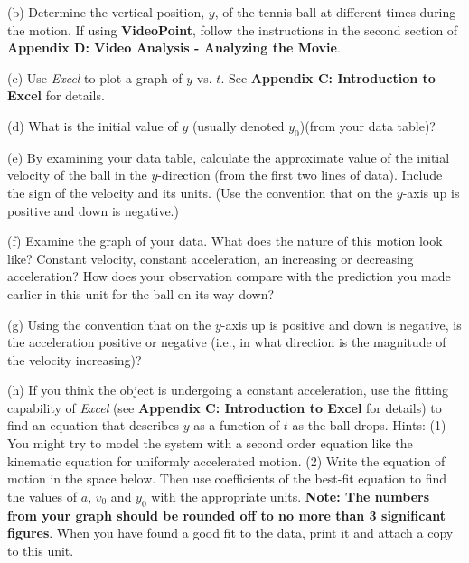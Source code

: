 (b) Determine the vertical position, $y$, of the tennis ball at different times
during the motion. If using \textbf{VideoPoint}, follow the instructions in the second section of \textbf{Appendix D: Video Analysis - Analyzing the Movie}. 

(c) Use \textit{Excel} to plot a graph of $y$ vs. $t$. See \textbf{Appendix
C: Introduction to Excel} for details.

(d) What is the initial value of $y$ (usually denoted \( y_{0} \))(from your data table)? 
\vspace{10mm}

(e) By examining your data table, calculate the approximate value of the initial velocity of the ball in the $y$-direction (from the first two lines of data). Include the sign of the velocity and its units. (Use the convention that on the $y$-axis up is positive and down is negative.)
\vspace{20mm}

(f) Examine the graph of your data. What does the nature of this motion look
like? Constant velocity, constant acceleration, an increasing or decreasing
acceleration? How does your observation compare with the prediction you made
earlier in this unit for the ball on its way down?
\vspace{20mm}

(g) Using the convention that on the $y$-axis up is positive and down is negative, is the acceleration positive or negative (i.e., in what direction is the magnitude of the velocity increasing)?
\vspace{20mm}

(h) If you think the object is undergoing a constant acceleration, use the fitting capability of \textit{Excel} (see \textbf{Appendix C: Introduction to
Excel} for details) to find an equation that describes $y$ as a function
of $t$ as the ball drops. Hints: (1) You might try to model the system with a
second order equation like the kinematic equation for uniformly accelerated
motion. (2) Write the equation of motion in the space below. Then use coefficients of the best-fit equation to find the values of $a$, \( v_{0} \) and \( y_{0} \) with the appropriate units. \textbf{Note: The numbers from your graph should be rounded off to no more than 3 significant figures}. When you have found a good fit to the data, print it and attach a copy to this unit. 

